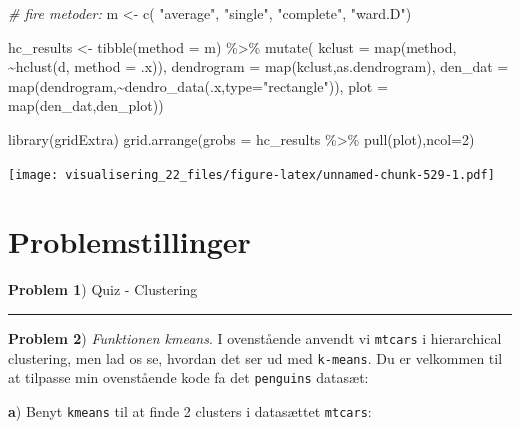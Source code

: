 \documentclass[
]{book}
\newenvironment{Shaded}{\begin{snugshade}}{\end{snugshade}}
\newcommand{\AttributeTok}[1]{\textcolor[rgb]{0.77,0.63,0.00}{#1}}
\newcommand{\CommentTok}[1]{\textcolor[rgb]{0.56,0.35,0.01}{\textit{#1}}}
\newcommand{\DecValTok}[1]{\textcolor[rgb]{0.00,0.00,0.81}{#1}}
\newcommand{\FunctionTok}[1]{\textcolor[rgb]{0.00,0.00,0.00}{#1}}
\newcommand{\NormalTok}[1]{#1}
\newcommand{\OtherTok}[1]{\textcolor[rgb]{0.56,0.35,0.01}{#1}}
\newcommand{\SpecialCharTok}[1]{\textcolor[rgb]{0.00,0.00,0.00}{#1}}
\newcommand{\StringTok}[1]{\textcolor[rgb]{0.31,0.60,0.02}{#1}}
\begin{document}
\begin{Shaded}
\begin{Highlighting}[]
\CommentTok{\# fire metoder:}
\NormalTok{m }\OtherTok{\textless{}{-}} \FunctionTok{c}\NormalTok{( }\StringTok{"average"}\NormalTok{, }\StringTok{"single"}\NormalTok{, }\StringTok{"complete"}\NormalTok{, }\StringTok{"ward.D"}\NormalTok{)}

\NormalTok{hc\_results }\OtherTok{\textless{}{-}} 
  \FunctionTok{tibble}\NormalTok{(}\AttributeTok{method =}\NormalTok{ m) }\SpecialCharTok{\%\textgreater{}\%}
  \FunctionTok{mutate}\NormalTok{( }\AttributeTok{kclust =} \FunctionTok{map}\NormalTok{(method, }\SpecialCharTok{\textasciitilde{}}\FunctionTok{hclust}\NormalTok{(d, }\AttributeTok{method =}\NormalTok{ .x)), }
          \AttributeTok{dendrogram =} \FunctionTok{map}\NormalTok{(kclust,as.dendrogram),}
          \AttributeTok{den\_dat =} \FunctionTok{map}\NormalTok{(dendrogram,}\SpecialCharTok{\textasciitilde{}}\FunctionTok{dendro\_data}\NormalTok{(.x,}\AttributeTok{type=}\StringTok{"rectangle"}\NormalTok{)),}
          \AttributeTok{plot =} \FunctionTok{map}\NormalTok{(den\_dat,den\_plot))}

\FunctionTok{library}\NormalTok{(gridExtra)}
\FunctionTok{grid.arrange}\NormalTok{(}\AttributeTok{grobs =}\NormalTok{ hc\_results }\SpecialCharTok{\%\textgreater{}\%} \FunctionTok{pull}\NormalTok{(plot),}\AttributeTok{ncol=}\DecValTok{2}\NormalTok{)}
\end{Highlighting}
\end{Shaded}

\texttt{[image: visualisering\_22\_files/figure-latex/unnamed-chunk-529-1.pdf]}

\hypertarget{problemstillinger-8}{%
\section{Problemstillinger}\label{problemstillinger-8}}

\textbf{Problem 1}) Quiz - Clustering

\begin{center}\rule{0.5\linewidth}{0.5pt}\end{center}

\textbf{Problem 2}) \emph{Funktionen kmeans}. I ovenstående anvendt vi \texttt{mtcars} i hierarchical clustering, men lad os se, hvordan det ser ud med \texttt{k-means}. Du er velkommen til at tilpasse min ovenstående kode fa det \texttt{penguins} datasæt:

\textbf{a}) Benyt \texttt{kmeans} til at finde 2 clusters i datasættet \texttt{mtcars}:
\end{document}
